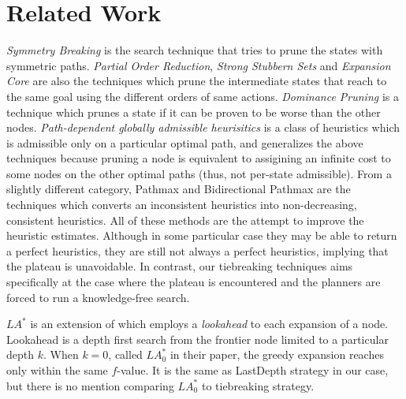\begin{figure}[htbp]
 \centering
 \caption{}
 \label{portfolio-ff}
\end{figure}


\section{Related Work}
\label{sec-4}

\emph{Symmetry Breaking}
\cite{Fox1998,pochter2011exploiting,domshlak2013symmetry} is the search
technique that tries to prune the states with symmetric
paths. \emph{Partial Order Reduction}, \emph{Strong Stubbern Sets} and
\emph{Expansion Core} are also the techniques which prune the
intermediate states that reach to the same goal using the different
orders of same actions. \emph{Dominance Pruning} \cite{hall2013faster} is a
technique which prunes a state if it can be proven to be worse than the other nodes.
% 
\emph{Path-dependent globally admissible
heurisitics} \cite{karpas2012optimal} is a class of heuristics which is
admissible only on a particular optimal path, and generalizes the above
techniques because pruning a node is equivalent to assigining an
infinite cost to some nodes on the other optimal paths (thus, not
per-state admissible).
From a slightly different category, Pathmax \cite{mero1984heuristic} and
Bidirectional Pathmax \cite{felner2011inconsistent} are the techniques
which converts an inconsistent heuristics into non-decreasing,
consistent heuristics.
All of these methods are the
attempt to improve the heuristic estimates. Although in some particular
case they may be able to return a perfect heuristics, they are still not
always a perfect heuristics, implying that the plateau is unavoidable.
In contrast, our tiebreaking techniques aims specifically at the case
where the plateau is encountered and the planners are forced to run a
knowledge-free search.

$LA^*$ \cite{stern2010look} is an extension of \astar which employs a
\emph{lookahead} to each expansion of a node. Lookahead is a depth first
search from the frontier node limited to a particular depth $k$. When
$k=0$, called $LA^*_0$ in their paper, the greedy expansion reaches only within
the same $f$-value. It is the same as LastDepth strategy in our
case, but there is no mention comparing $LA^*_0$ to tiebreaking strategy.


